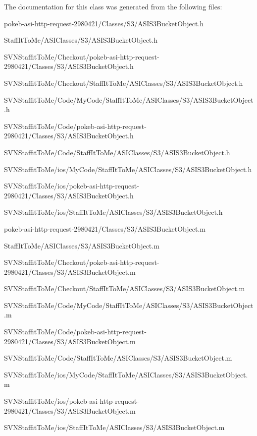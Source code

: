 \-The documentation for this class was generated from the following files\-:\begin{DoxyCompactItemize}
\item 
pokeb-\/asi-\/http-\/request-\/2980421/\-Classes/\-S3/\-A\-S\-I\-S3\-Bucket\-Object.\-h\item 
\-Staff\-It\-To\-Me/\-A\-S\-I\-Classes/\-S3/\-A\-S\-I\-S3\-Bucket\-Object.\-h\item 
\-S\-V\-N\-Staffit\-To\-Me/\-Checkout/pokeb-\/asi-\/http-\/request-\/2980421/\-Classes/\-S3/\-A\-S\-I\-S3\-Bucket\-Object.\-h\item 
\-S\-V\-N\-Staffit\-To\-Me/\-Checkout/\-Staff\-It\-To\-Me/\-A\-S\-I\-Classes/\-S3/\-A\-S\-I\-S3\-Bucket\-Object.\-h\item 
\-S\-V\-N\-Staffit\-To\-Me/\-Code/\-My\-Code/\-Staff\-It\-To\-Me/\-A\-S\-I\-Classes/\-S3/\-A\-S\-I\-S3\-Bucket\-Object.\-h\item 
\-S\-V\-N\-Staffit\-To\-Me/\-Code/pokeb-\/asi-\/http-\/request-\/2980421/\-Classes/\-S3/\-A\-S\-I\-S3\-Bucket\-Object.\-h\item 
\-S\-V\-N\-Staffit\-To\-Me/\-Code/\-Staff\-It\-To\-Me/\-A\-S\-I\-Classes/\-S3/\-A\-S\-I\-S3\-Bucket\-Object.\-h\item 
\-S\-V\-N\-Staffit\-To\-Me/ios/\-My\-Code/\-Staff\-It\-To\-Me/\-A\-S\-I\-Classes/\-S3/\-A\-S\-I\-S3\-Bucket\-Object.\-h\item 
\-S\-V\-N\-Staffit\-To\-Me/ios/pokeb-\/asi-\/http-\/request-\/2980421/\-Classes/\-S3/\-A\-S\-I\-S3\-Bucket\-Object.\-h\item 
\-S\-V\-N\-Staffit\-To\-Me/ios/\-Staff\-It\-To\-Me/\-A\-S\-I\-Classes/\-S3/\-A\-S\-I\-S3\-Bucket\-Object.\-h\item 
pokeb-\/asi-\/http-\/request-\/2980421/\-Classes/\-S3/\-A\-S\-I\-S3\-Bucket\-Object.\-m\item 
\-Staff\-It\-To\-Me/\-A\-S\-I\-Classes/\-S3/\-A\-S\-I\-S3\-Bucket\-Object.\-m\item 
\-S\-V\-N\-Staffit\-To\-Me/\-Checkout/pokeb-\/asi-\/http-\/request-\/2980421/\-Classes/\-S3/\-A\-S\-I\-S3\-Bucket\-Object.\-m\item 
\-S\-V\-N\-Staffit\-To\-Me/\-Checkout/\-Staff\-It\-To\-Me/\-A\-S\-I\-Classes/\-S3/\-A\-S\-I\-S3\-Bucket\-Object.\-m\item 
\-S\-V\-N\-Staffit\-To\-Me/\-Code/\-My\-Code/\-Staff\-It\-To\-Me/\-A\-S\-I\-Classes/\-S3/\-A\-S\-I\-S3\-Bucket\-Object.\-m\item 
\-S\-V\-N\-Staffit\-To\-Me/\-Code/pokeb-\/asi-\/http-\/request-\/2980421/\-Classes/\-S3/\-A\-S\-I\-S3\-Bucket\-Object.\-m\item 
\-S\-V\-N\-Staffit\-To\-Me/\-Code/\-Staff\-It\-To\-Me/\-A\-S\-I\-Classes/\-S3/\-A\-S\-I\-S3\-Bucket\-Object.\-m\item 
\-S\-V\-N\-Staffit\-To\-Me/ios/\-My\-Code/\-Staff\-It\-To\-Me/\-A\-S\-I\-Classes/\-S3/\-A\-S\-I\-S3\-Bucket\-Object.\-m\item 
\-S\-V\-N\-Staffit\-To\-Me/ios/pokeb-\/asi-\/http-\/request-\/2980421/\-Classes/\-S3/\-A\-S\-I\-S3\-Bucket\-Object.\-m\item 
\-S\-V\-N\-Staffit\-To\-Me/ios/\-Staff\-It\-To\-Me/\-A\-S\-I\-Classes/\-S3/\-A\-S\-I\-S3\-Bucket\-Object.\-m\end{DoxyCompactItemize}

